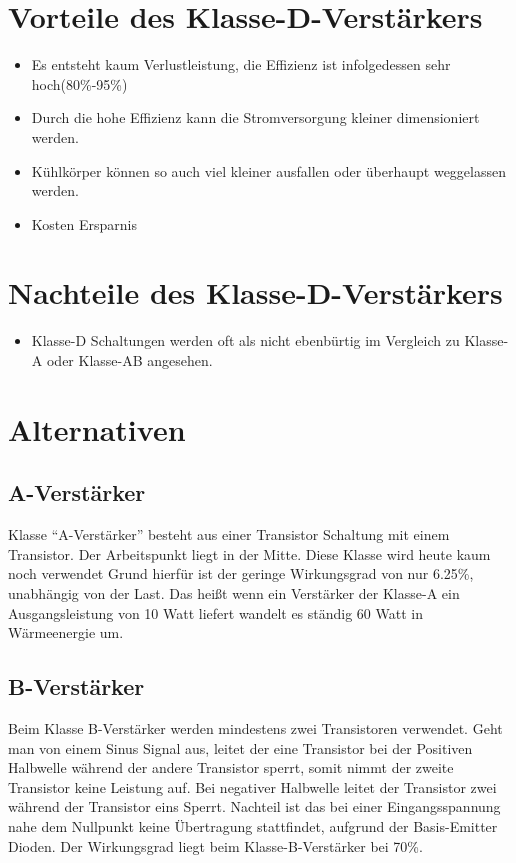 \documentclass[11pt,a4paper,bibtotoc,oneside]{scrbook}
\begin{document}
\section{Vorteile des Klasse-D-Verstärkers}
\begin{itemize}
    \item Es entsteht kaum Verlustleistung, die Effizienz ist infolgedessen  sehr hoch(80\%-95\%)
    \item Durch die hohe Effizienz kann die Stromversorgung kleiner dimensioniert werden.
    \item Kühlkörper können so auch viel kleiner ausfallen oder überhaupt weggelassen werden.
    \item Kosten Ersparnis
\end{itemize}
\section{Nachteile des Klasse-D-Verstärkers}
\begin{itemize}
    \item Klasse-D Schaltungen werden oft als nicht ebenbürtig im Vergleich zu Klasse-A oder Klasse-AB angesehen.
\end{itemize}


\section{Alternativen}
\subsection{A-Verstärker}
Klasse ``A-Verstärker'' besteht aus einer Transistor Schaltung mit einem Transistor. Der Arbeitspunkt liegt
in der Mitte. Diese Klasse wird heute kaum noch verwendet Grund hierfür ist der geringe
Wirkungsgrad von nur 6.25\%, unabhängig von der Last. Das heißt wenn ein Verstärker der Klasse-A ein Ausgangsleistung
von 10 Watt liefert wandelt es ständig 60 Watt in Wärmeenergie um. \textcolor{blue}{\cite{csA}}
\subsection{B-Verstärker}
Beim Klasse B-Verstärker werden mindestens zwei Transistoren verwendet. Geht man von einem Sinus Signal aus, leitet der
eine Transistor bei der Positiven Halbwelle während der andere Transistor sperrt, somit nimmt der zweite Transistor
keine  Leistung auf. Bei negativer Halbwelle leitet der Transistor zwei während der Transistor eins Sperrt.
Nachteil ist das bei einer Eingangsspannung nahe dem Nullpunkt keine Übertragung stattfindet, aufgrund der
Basis-Emitter Dioden.
Der Wirkungsgrad liegt beim Klasse-B-Verstärker bei 70\%.
\textcolor{blue}{\cite{csA}}
\end{document}
